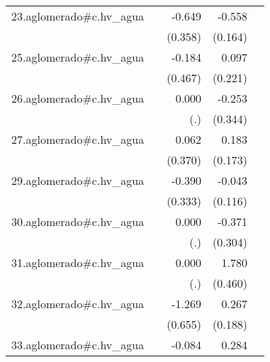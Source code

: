{\begin{longtable}{l*{4}{D{.}{.}{-1}}}
\addlinespace
23.aglomerado#c.hv\_agua&                     &      -0.649         &      -0.558\sym{***}&                     \\
            &                     &     (0.358)         &     (0.164)         &                     \\
\addlinespace
25.aglomerado#c.hv\_agua&                     &      -0.184         &       0.097         &                     \\
            &                     &     (0.467)         &     (0.221)         &                     \\
\addlinespace
26.aglomerado#c.hv\_agua&                     &       0.000         &      -0.253         &                     \\
            &                     &         (.)         &     (0.344)         &                     \\
\addlinespace
27.aglomerado#c.hv\_agua&                     &       0.062         &       0.183         &                     \\
            &                     &     (0.370)         &     (0.173)         &                     \\
\addlinespace
29.aglomerado#c.hv\_agua&                     &      -0.390         &      -0.043         &                     \\
            &                     &     (0.333)         &     (0.116)         &                     \\
\addlinespace
30.aglomerado#c.hv\_agua&                     &       0.000         &      -0.371         &                     \\
            &                     &         (.)         &     (0.304)         &                     \\
\addlinespace
31.aglomerado#c.hv\_agua&                     &       0.000         &       1.780\sym{***}&                     \\
            &                     &         (.)         &     (0.460)         &                     \\
\addlinespace
32.aglomerado#c.hv\_agua&                     &      -1.269         &       0.267         &                     \\
            &                     &     (0.655)         &     (0.188)         &                     \\
\addlinespace
33.aglomerado#c.hv\_agua&                     &      -0.084         &       0.284\sym{***}&                     \\

\end{longtable}}
